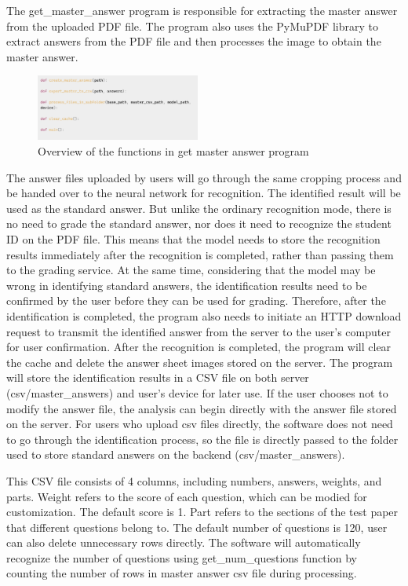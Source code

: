 \documentclass[twocolumn]{article}
\begin{document}
        The get\_master\_answer program is responsible for extracting the master answer from the uploaded PDF file. The program also uses the PyMuPDF library\cite{pymupdf} to extract answers from the PDF file and then processes the image to obtain the master answer. 

        \begin{figure}[ht]
            \centering
            \includegraphics[width=0.48\textwidth]{get_master_answer.png}
            \caption{Overview of the functions in get master answer program}
            \label{fig:get_master_answer}
        \end{figure}

        The answer files uploaded by users will go through the same cropping process and be handed over to the neural network for recognition. The identified result will be used as the standard answer. But unlike the ordinary recognition mode, there is no need to grade the standard answer, nor does it need to recognize the student ID on the PDF file. This means that the model needs to store the recognition results immediately after the recognition is completed, rather than passing them to the grading service. At the same time, considering that the model may be wrong in identifying standard answers, the identification results need to be confirmed by the user before they can be used for grading. Therefore, after the identification is completed, the program also needs to initiate an HTTP download request to transmit the identified answer from the server to the user's computer for user confirmation. After the recognition is completed, the program will clear the cache and delete the answer sheet images stored on the server. The program will store the identification results in a CSV file on both server (csv/master\_answers) and user's device for later use. If the user chooses not to modify the answer file, the analysis can begin directly with the answer file stored on the server. For users who upload csv files directly, the software does not need to go through the identification process, so the file is directly passed to the folder used to store standard answers on the backend (csv/master\_answers).

        This CSV file consists of 4 columns, including numbers, answers, weights, and parts. Weight refers to the score of each question, which can be modied for customization. The default score is 1. Part refers to the sections of the test paper that different questions belong to. The default number of questions is 120, user can also delete unnecessary rows directly. The software will automatically recognize the number of questions using get\_num\_questions function by counting the number of rows in master answer csv file during processing.
\end{document}
